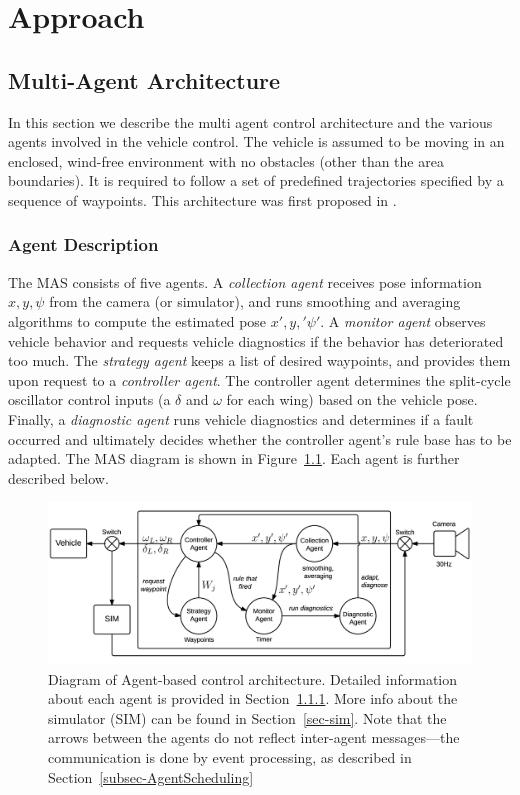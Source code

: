 \chapter{Approach}
\label{ch:approach}

\section{Multi-Agent Architecture}
\label{sec-ControlArch}
In this section we describe the multi agent control architecture and the various agents involved in the vehicle control. The vehicle is assumed to be moving in an enclosed, wind-free environment with no obstacles (other than the area boundaries). It is required to follow a set of predefined trajectories specified by a sequence of waypoints. This architecture was first proposed in \cite{podhrad1}.


\subsection{Agent Description}
\label{subsec-agentDescription}
The MAS consists of five agents. A \textit{collection agent} receives pose information $x, y, \psi$ from the camera (or simulator), and runs smoothing and averaging algorithms to compute the estimated pose $x', y,' \psi'$. A \textit{monitor agent} observes vehicle behavior and requests vehicle diagnostics if the behavior has deteriorated too much. The \textit{strategy agent} keeps a list of desired waypoints, and provides them upon request to a \textit{controller agent}. The controller agent determines the split-cycle oscillator control inputs (a $\delta$ and $\omega$ for each wing) based on the vehicle pose. Finally, a \textit{diagnostic agent} runs vehicle diagnostics and determines if a fault occurred and ultimately decides whether the controller agent's rule base has to be adapted. The MAS diagram is shown in Figure~\ref{fig_agents}. Each agent is further described below. \vspace{2ex}

\begin{figure}
\centering
\includegraphics[width=\textwidth]{Files/Figures/mas_overview.png}
\caption[Diagram of Agent-based control architecture]{Diagram of Agent-based control architecture. Detailed information about each agent is provided in Section~\ref{subsec-agentDescription}. More info about the simulator (SIM) can be found in Section~\ref{sec-sim}. Note that the arrows between the agents do not reflect inter-agent messages---the communication is done by event processing, as described in Section~\ref{subsec-AgentScheduling}}
\label{fig_agents}
\end{figure}

